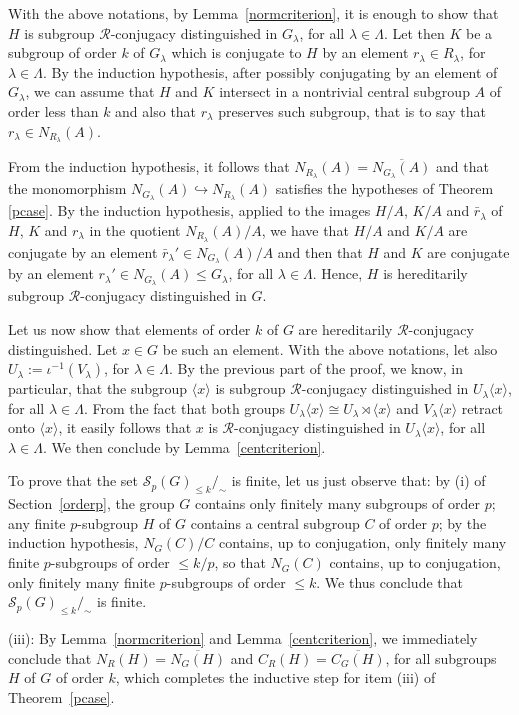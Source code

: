 \documentclass[12pt,twoside]{amsart}
\newcommand\la{\langle}
\newcommand\ra{\rangle}
\newcommand\cR{{\mathcal R}}
\newcommand\hookra{\hookrightarrow}
\newcommand\ol{\overline}
\newcommand\cS{{\mathscr S}}
\newcommand\ld{\lambda}
\newcommand\Ld{\Lambda}
\theoremstyle{definition}
\begin{document}
With the above notations, by Lemma~\ref{normcriterion}, it is enough to show that $H$ is subgroup $\cR$-conjugacy distinguished in $G_\ld$, 
for all $\ld\in\Ld$.
Let then $K$ be a subgroup of order $k$ of $G_\ld$ which is conjugate to $H$ by an element $r_\ld\in R_\ld$, for $\ld\in\Ld$.
By the induction hypothesis, after possibly conjugating by an element of $G_\ld$,  we can assume that $H$ and $K$ intersect
in a nontrivial central subgroup $A$ of order less than $k$ and also that $r_\ld$ preserves such subgroup, 
that is to say that $r_\ld\in N_{R_\ld}(A)$.

From the induction hypothesis, it follows that $N_{R_\ld}(A)=\ol{N_{G_\ld}(A)}$ and that the monomorphism $N_{G_\ld}(A)\hookra N_{R_\ld}(A)$
satisfies the hypotheses of Theorem \ref{pcase}. By the induction hypothesis, applied to the images 
$H/A$, $K/A$ and $\bar r_\ld$ of $H$, $K$ and $r_\ld$ in the quotient $N_{R_\ld}(A)/A$, we have that $H/A$ and $K/A$ are conjugate
by an element $\bar r_\ld'\in N_{G_\ld}(A)/A$ and then that $H$ and $K$ are conjugate by an element $r_\ld'\in N_{G_\ld}(A)\leq G_\ld$, 
for all $\ld\in\Ld$. Hence, $H$ is hereditarily subgroup $\cR$-conjugacy distinguished in $G$.

Let us now show that elements of order $k$ of $G$ are hereditarily $\cR$-conjugacy distinguished. Let $x\in G$ be such an element.
With the above notations, let also $U_\ld:=\iota^{-1}(V_\ld)$, for $\ld\in\Ld$. By the previous part of the proof, we know, in particular, 
that the subgroup $\la x\ra$ is subgroup $\cR$-conjugacy distinguished in $U_\ld\la x\ra$, for all $\ld\in\Ld$. From the fact that both groups 
$U_\ld\la x\ra\cong U_\ld\rtimes\la x\ra$ and $V_\ld\la x\ra$ retract onto $\la x\ra$, it easily follows that $x$ is $\cR$-conjugacy 
distinguished in $U_\ld\la x\ra$, for all $\ld\in\Ld$. We then conclude by Lemma~\ref{centcriterion}.

To prove that the set $\cS_p(G)_{\leq k}/_{\sim}$ is finite, let us just observe that: by (i) of Section~\ref{orderp}, the group $G$ contains only finitely many 
subgroups of order $p$; any finite $p$-subgroup $H$ of $G$ contains a central subgroup $C$ of order $p$; by the induction hypothesis, $N_G(C)/C$ 
contains, up to conjugation, only finitely many finite $p$-subgroups of order $\leq k/p$, so that $N_G(C)$ contains, up to conjugation, 
only finitely many finite $p$-subgroups of order $\leq k$. We thus conclude that $\cS_p(G)_{\leq k}/_{\sim}$ is finite.
\smallskip

\noindent
(iii): By Lemma~\ref{normcriterion} and Lemma~\ref{centcriterion}, we immediately conclude that $N_{R}(H)=\ol{N_G(H)}$ and $C_{R}(H)=\ol{C_G(H)}$, 
for all subgroups $H$ of $G$ of order $k$, which completes the inductive step for item (iii) of Theorem~\ref{pcase}. 
\smallskip
\end{document}
